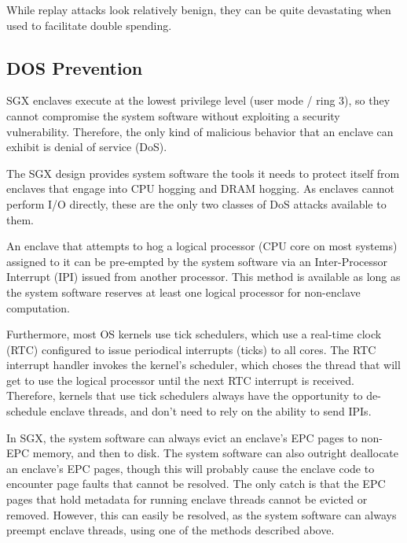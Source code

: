 While replay attacks look relatively benign, they can be quite devastating when
used to facilitate double spending.


\subsection{DOS Prevention}

SGX enclaves execute at the lowest privilege level (user mode / ring 3), so
they cannot compromise the system software without exploiting a security
vulnerability. Therefore, the only kind of malicious behavior that an enclave
can exhibit is denial of service (DoS).

The SGX design provides system software the tools it needs to protect itself
from enclaves that engage into CPU hogging and DRAM hogging. As enclaves cannot
perform I/O directly, these are the only two classes of DoS attacks available
to them.

An enclave that attempts to hog a logical processor (CPU core on most systems)
assigned to it can be pre-empted by the system software via an Inter-Processor
Interrupt (IPI) issued from another processor. This method is available as long
as the system software reserves at least one logical processor for non-enclave
computation.

Furthermore, most OS kernels use tick schedulers, which use a real-time clock
(RTC) configured to issue periodical interrupts (ticks) to all cores. The RTC
interrupt handler invokes the kernel's scheduler, which choses the thread that
will get to use the logical processor until the next RTC interrupt is received.
Therefore, kernels that use tick schedulers always have the opportunity to
de-schedule enclave threads, and don't need to rely on the ability to send
IPIs.

In SGX, the system software can always evict an enclave's EPC pages to non-EPC
memory, and then to disk. The system software can also outright deallocate an
enclave's EPC pages, though this will probably cause the enclave code to
encounter page faults that cannot be resolved. The only catch is that the EPC
pages that hold metadata for running enclave threads cannot be evicted or
removed. However, this can easily be resolved, as the system software can
always preempt enclave threads, using one of the methods described above.


